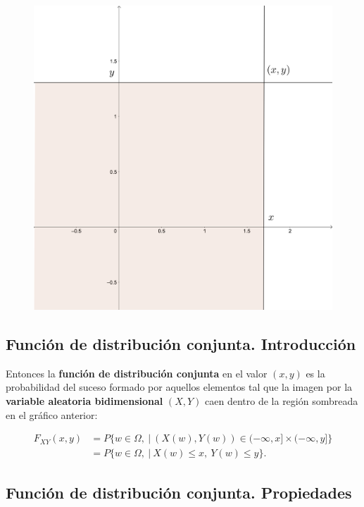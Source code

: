 \documentclass[]{book}
\begin{document}
\begin{figure}
\includegraphics[width=450px]{Images/Fxy} \end{figure}

\hypertarget{funciuxf3n-de-distribuciuxf3n-conjunta.-introducciuxf3n-2}{%
\subsection{Función de distribución conjunta. Introducción}\label{funciuxf3n-de-distribuciuxf3n-conjunta.-introducciuxf3n-2}}

Entonces la \textbf{función de distribución conjunta} en el valor \((x,y)\) es la probabilidad del suceso formado por aquellos elementos tal que la imagen por la \textbf{variable aleatoria bidimensional} \((X,Y)\) caen dentro de la región sombreada en el gráfico anterior:

\[
\begin{array}{rl}
F_{XY}(x,y) & =P\{w\in\Omega,\ |\ (X(w),Y(w))\in (-\infty,x]\times (-\infty,y]\} \\ & = P\{w\in\Omega,\ |\ X(w)\leq x,\ Y(w)\leq y\}.
\end{array}
\]

\hypertarget{funciuxf3n-de-distribuciuxf3n-conjunta.-propiedades}{%
\subsection{Función de distribución conjunta. Propiedades}\label{funciuxf3n-de-distribuciuxf3n-conjunta.-propiedades}}
\end{document}
